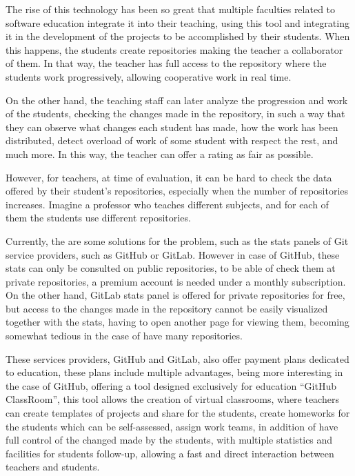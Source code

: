 The rise of this technology has been so great that multiple faculties
related to software education integrate it into their teaching, using this
tool and integrating it in the development of the projects to be
accomplished by their students. When this happens, the students create
repositories making the teacher a collaborator of them. In that way, the
teacher has full access to the repository where the students work
progressively, allowing cooperative work in real time.

On the other hand, the teaching staff can later analyze the progression and
work of the students, checking the changes made in the repository, in such
a way that they can observe what changes each student has made, how the
work has been distributed, detect overload of work of some student with
respect the rest, and much more. In this way, the teacher can offer a rating
as fair as possible.

However, for teachers, at time of evaluation, it can be hard to check the
data offered by their student’s repositories, especially when the number of
repositories increases. Imagine a professor who teaches different subjects,
and for each of them the students use different repositories.

Currently, the are some solutions for the problem, such as the stats panels
of Git service providers, such as GitHub or GitLab. However in case of
GitHub, these stats can only be consulted on public repositories, to be
able of check them at private repositories, a premium account is needed
under a monthly subscription. On the other hand, GitLab stats panel is
offered for private repositories for free, but access to the changes made
in the repository cannot be easily visualized together with the stats,
having to open another page for viewing them, becoming somewhat tedious in
the case of have many repositories.

These services providers, GitHub and GitLab, also offer payment plans
dedicated to education, these plans include multiple advantages, being more
interesting in the case of GitHub, offering a tool designed exclusively for
education “GitHub ClassRoom”, this tool allows the creation of virtual
classrooms, where teachers can create templates of projects and share for
the students, create homeworks for the students which can be self-assessed,
assign work teams, in addition of have full control of the changed made by
the students, with multiple statistics and facilities for students
follow-up, allowing a fast and direct interaction between teachers and
students.

